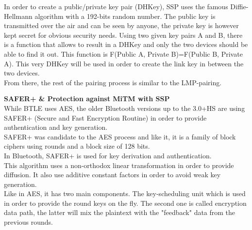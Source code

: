 In order to create a public/private key pair (DHKey), SSP uses the famous Diffie-Hellmann algorithm with a 192-bits random number. The public key is transmitted over the air and can be seen by anyone, the private key is however kept secret for obvious security needs. 
Using two given key pairs A and B, there is a function that allows to result in a DHKey and only the two devices should be able to find it out. This function is F(Public A, Private B)=F(Public B, Private A). This very DHKey will be used in order to create the link key in between the two devices. \\ 
From there, the rest of the pairing process is similar to the LMP-pairing.

\newpage
\textbf{SAFER+ \& Protection against MiTM with SSP}\\

While BTLE uses AES, the older Bluetooth versions up to the 3.0+HS are using SAFER+ (Secure and Fast Encryption Routine) in order to provide authentication and key generation.\\
SAFER+ was candidate to the AES process and like it, it is a family of block ciphers using rounds and a block size of 128 bits.\\
In Bluetooth, SAFER+ is used for key derivation and authentication.\\
This algorithm uses a non-orthodox linear transformation in order to provide diffusion. It also use additive constant factors in order to avoid weak key generation.\\
Like in AES, it has two main components. The key-scheduling unit which is used in order to provide the round keys on the fly. The second one is called encryption data path, the latter will mix the plaintext with the "feedback" data from the previous rounds.\\


